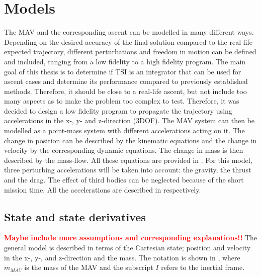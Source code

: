

\chapter{Models} 
\label{ch:models}
The \ac{MAV} and the corresponding ascent can be modelled in many different ways. Depending on the desired accuracy of the final solution compared to the real-life expected trajectory, different perturbations and freedom in motion can be defined and included, ranging from a low fidelity to a high fidelity program. The main goal of this thesis is to determine if \ac{TSI} is an integrator that can be used for ascent cases and determine its performance compared to previously established methods. Therefore, it should be close to a real-life ascent, but not include too many aspects as to make the problem too complex to test. Therefore, it was decided to design a low fidelity program to propagate the trajectory using accelerations in the x-, y- and z-direction (3DOF). The \ac{MAV} system can then be modelled as a point-mass system with different accelerations acting on it. The change in position can be described by the kinematic equations and the change in velocity by the corresponding dynamic equations. The change in mass is then described by the mass-flow. All these equations are provided in . For this model, three perturbing accelerations will be taken into account: the gravity, the thrust and the drag. The effect of third bodies can be neglected because of the short mission time. All the accelerations are described in  respectively. 

\section{State and state derivatives}
\label{sec:stateAndStateDerivatives}
\textbf{\textcolor{red}{Maybe include more assumptions and corresponding explanations!!}}
The general model is described in terms of the Cartesian state; position and velocity in the x-, y-, and z-direction and the mass. The notation is shown in , where $m_{MAV}$ is the mass of the \ac{MAV} and the subscript $I$ refers to the inertial frame.

